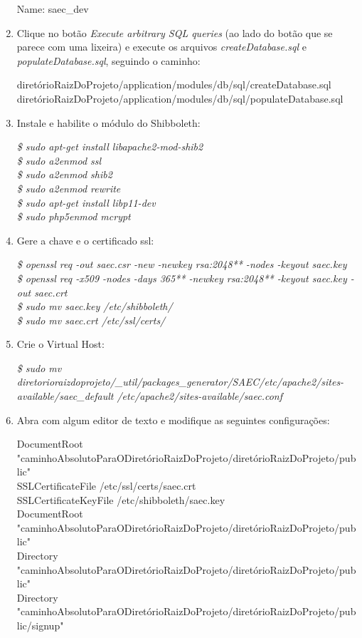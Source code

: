 \begin{enumerate}
  Name: saec\_dev
  
  \item Clique no botão \textit{Execute arbitrary SQL queries} (ao lado do botão que se parece com uma lixeira) e execute os arquivos \textit{createDatabase.sql} e \textit{populateDatabase.sql}, seguindo o caminho:
  
    diretórioRaizDoProjeto/application/modules/db/sql/createDatabase.sql \\
    diretórioRaizDoProjeto/application/modules/db/sql/populateDatabase.sql
  
  \item Instale e habilite o módulo do Shibboleth:
  
    \textit{\$ sudo apt-get install libapache2-mod-shib2} \\
    \textit{\$ sudo a2enmod ssl} \\
    \textit{\$ sudo a2enmod shib2}\\
    \textit{\$ sudo a2enmod rewrite}\\
    \textit{\$ sudo apt-get install libp11-dev}\\
    \textit{\$ sudo php5enmod mcrypt}
    
    \item Gere a chave e o certificado ssl:
    
      \textit{\$ openssl req -out saec.csr -new -newkey rsa:2048** -nodes -keyout saec.key} \\
      \textit{\$ openssl req -x509 -nodes -days 365** -newkey rsa:2048** -keyout saec.key -out saec.crt} \\
      \textit{\$ sudo mv saec.key /etc/shibboleth/}\\
      \textit{\$ sudo mv saec.crt /etc/ssl/certs/}
      
    \item Crie o Virtual Host:
    
      \textit{\$ sudo mv diretorioraizdoprojeto/\_util/packages\_generator/SAEC/etc/apache2/sites-available/saec\_default /etc/apache2/sites-available/saec.conf}
    
    \item Abra com algum editor de texto e modifique as seguintes configurações:
    
    DocumentRoot "caminhoAbsolutoParaODiretórioRaizDoProjeto/diretórioRaizDoProjeto/public" \\
    SSLCertificateFile /etc/ssl/certs/saec.crt \\
    SSLCertificateKeyFile /etc/shibboleth/saec.key \\
    DocumentRoot "caminhoAbsolutoParaODiretórioRaizDoProjeto/diretórioRaizDoProjeto/public" \\
    Directory "caminhoAbsolutoParaODiretórioRaizDoProjeto/diretórioRaizDoProjeto/public" \\
    Directory "caminhoAbsolutoParaODiretórioRaizDoProjeto/diretórioRaizDoProjeto/public/signup" 
    

\end{enumerate}
